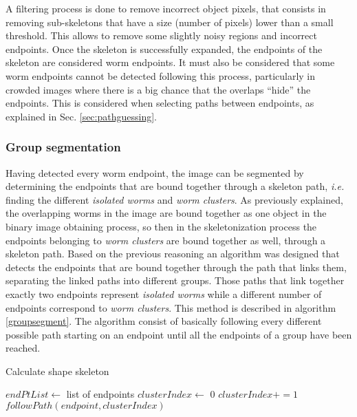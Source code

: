 A filtering process is done to remove incorrect object pixels, that consists in
removing sub-skeletons that have a size (number of pixels) lower than a small 
threshold. This allows to remove some slightly noisy regions and incorrect endpoints.
Once the skeleton is successfully expanded, the endpoints of the skeleton are considered
worm endpoints. 
It must also be considered that some worm endpoints cannot be detected following this 
process, particularly in crowded images where there is a big chance that the
overlaps ``hide'' the endpoints. This is considered when selecting paths between 
endpoints, as explained in Sec. \ref{sec:pathguessing}.



\subsubsection*{Group segmentation}

Having detected every worm endpoint, the image can be segmented by determining
the endpoints that are bound together through a skeleton path, \emph{i.e.} finding 
the different \emph{isolated worms} and \emph{worm clusters}.
As previously explained, the overlapping worms in the image are bound together
as one object in the binary image obtaining process, so then in the skeletonization
process the endpoints belonging to \emph{worm clusters} are bound together as well,
through a skeleton path.
Based on the previous reasoning an algorithm was designed that detects the endpoints 
that are bound together through the path that links them, separating the 
linked paths into different groups. Those paths that link together exactly two
endpoints represent \emph{isolated worms} while a different number of endpoints
correspond to \emph{worm clusters}.
This method is described in algorithm \ref{groupsegment}. The algorithm consist of
basically following every different
possible path starting on an endpoint until all the endpoints of a group have been 
reached. 

\begin{algorithm}                     
\caption{Calculate shape skeleton}         
\label{groupsegment}                    
\begin{algorithmic}                   

\STATE $endPtList \leftarrow$ list of endpoints
\STATE $clusterIndex \leftarrow$ 0
\STATE {}
\ELSE
\STATE $clusterIndex +=1$
\STATE $followPath(endpoint,clusterIndex)$
\ENDIF
\ENDFOR
\end{algorithmic}
\end{algorithm}

